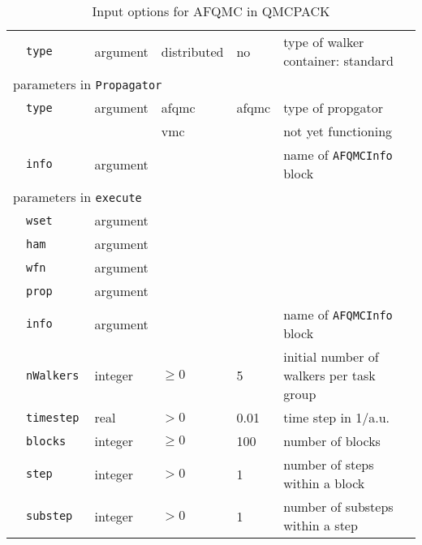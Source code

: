 \begin{table}[h]
\begin{center}
\begin{tabularx}{\textwidth}{l l l l l l }
   &   \texttt{type            } &  argument   & distributed & no   & type of walker container: standard \\
\multicolumn{6}{l}{parameters in \texttt{Propagator}} \\
   &   \texttt{type            } &  argument   & afqmc & afqmc & type of propgator \\
   &   \texttt{                } &             &  vmc  &       & not yet functioning \\
   &   \texttt{info            } &  argument   &       &       & name of \texttt{AFQMCInfo} block \\
\multicolumn{6}{l}{parameters in \texttt{execute}} \\
   &   \texttt{wset            } &  argument    &         &      &  \\
   &   \texttt{ham             } & argument     &         &      &  \\
   &   \texttt{wfn             } & argument     &         &      &  \\
   &   \texttt{prop            } & argument     &         &      &  \\
   &   \texttt{info            } &  argument    &         &      & name of \texttt{AFQMCInfo} block \\
   &   \texttt{nWalkers        } &  integer     & $\ge 0$ & 5    & initial number of walkers per task group   \\
   &   \texttt{timestep        } &  real        & $> 0$   & 0.01 & time step in 1/a.u. \\
   &   \texttt{blocks          } &  integer     & $\ge 0$ & 100  & number of blocks            \\
   &   \texttt{step            } &  integer     & $> 0$   & 1    & number of steps within a block \\
   &   \texttt{substep         } &  integer     & $> 0$   & 1    & number of substeps within a step \\
  \hline
\end{tabularx}
\end{center}
\caption{Input options for AFQMC in QMCPACK}
\label{table:afqmc_basic}
\end{table}

